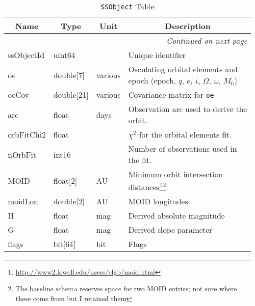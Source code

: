 \documentclass[12pt]{article}
\newcommand{\code}[1]{\texttt{#1}}
\newcommand{\SSObject}{\code{SSObject}\xspace}
\begin{document}
\begin{center}
\begin{longtable}{p{3cm}p{2cm}p{2cm}p{5cm}}
\caption[\SSObject Table]{\SSObject Table} \\

\hline \multicolumn{1}{c}{\bf Name} & \multicolumn{1}{c}{\bf Type} & \multicolumn{1}{c}{\bf Unit} & \multicolumn{1}{c}{\bf Description} \\ \hline
\endhead

\hline \multicolumn{4}{r}{{\em Continued on next page}} \\
\endfoot

\hline\hline
\endlastfoot

ssObjectId & uint64 & ~ & Unique identifier \\ 

oe & double[7] & various & Osculating orbital elements and epoch (epoch, $q$, $e$, $i$, $\Omega$, $\omega$, $M_0$) \\

oeCov & double[21] & various & Covariance matrix for \texttt{oe} \\

arc & float & days & Observation arc used to derive the orbit. \\

orbFitChi2 & float & ~ & $\chi^2$ for the orbital elements fit. \\

nOrbFit & int16 & ~ & Number of observations used in the fit. \\

MOID & float[2] & AU & Minimum orbit intersection distances\footnote{\url{http://www2.lowell.edu/users/elgb/moid.html}}\footnote{The baseline schema reserves space for two MOID entries; not sure where these come from but I retained them}. \\

moidLon & double[2] & AU & MOID longitudes. \\

H & float & mag & Derived absolute magnitude \\

G & float & mag & Derived slope parameter \\

flags & bit[64] & bit & Flags \\ \hline

\end{longtable}
\end{center}
\end{document}
